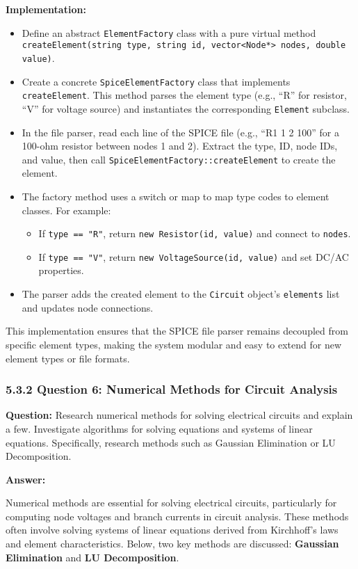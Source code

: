 \documentclass{article}
\begin{document}
\textbf{Implementation:}
\begin{itemize}
    \item Define an abstract \texttt{ElementFactory} class with a pure virtual method \texttt{createElement(string type, string id, vector<Node*> nodes, double value)}.
    \item Create a concrete \texttt{SpiceElementFactory} class that implements \texttt{createElement}. This method parses the element type (e.g., “R” for resistor, “V” for voltage source) and instantiates the corresponding \texttt{Element} subclass.
    \item In the file parser, read each line of the SPICE file (e.g., “R1 1 2 100” for a 100-ohm resistor between nodes 1 and 2). Extract the type, ID, node IDs, and value, then call \texttt{SpiceElementFactory::createElement} to create the element.
    \item The factory method uses a switch or map to map type codes to element classes. For example:
    \begin{itemize}
        \item If \texttt{type == "R"}, return \texttt{new Resistor(id, value)} and connect to \texttt{nodes}.
        \item If \texttt{type == "V"}, return \texttt{new VoltageSource(id, value)} and set DC/AC properties.
    \end{itemize}
    \item The parser adds the created element to the \texttt{Circuit} object’s \texttt{elements} list and updates node connections.
\end{itemize}

This implementation ensures that the SPICE file parser remains decoupled from specific element types, making the system modular and easy to extend for new element types or file formats.

\subsubsection*{5.3.2 Question 6: Numerical Methods for Circuit Analysis}

\textbf{Question:} Research numerical methods for solving electrical circuits and explain a few. Investigate algorithms for solving equations and systems of linear equations. Specifically, research methods such as Gaussian Elimination or LU Decomposition.

\textbf{Answer:}

Numerical methods are essential for solving electrical circuits, particularly for computing node voltages and branch currents in circuit analysis. These methods often involve solving systems of linear equations derived from Kirchhoff’s laws and element characteristics. Below, two key methods are discussed: \textbf{Gaussian Elimination} and \textbf{LU Decomposition}.
\end{document}
